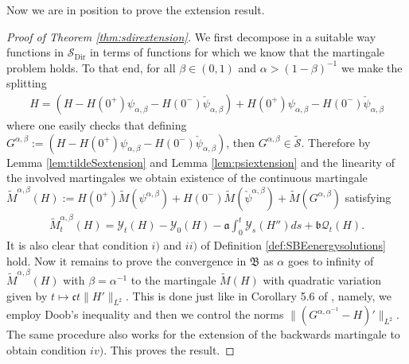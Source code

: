 \documentclass[a4paper, reqno, 12pt]{amsart}
\theoremstyle{plain}
\theoremstyle{definition}
\begin{document}
Now we are in position to prove the extension result.

\begin{proof}[Proof of Theorem \ref{thm:sdirextension}]
  We first decompose in a suitable way functions in $\mathcal S_{\textrm{Dir}}$ in terms of functions for which we know that the martingale problem holds. To that end, for all $\beta\in(0,1)$ and $\alpha>(1-\beta)^{-1}$ we make the splitting
    \begin{align*}
        H = (H - H(0^+)\psi_{\alpha,\beta} -H(0^-)\check\psi_{\alpha,\beta}) + H(0^+)\psi_{\alpha,\beta} -H(0^-)\check\psi_{\alpha,\beta}
    \end{align*}
    where one easily checks that defining $G^{\alpha,\beta}:=(H - H(0^+)\psi_{\alpha,\beta} -H(0^-)\check\psi_{\alpha,\beta})$, then  $G^{\alpha,\beta}\in \tilde{\mathcal S}$. Therefore by Lemma \ref{lem:tildeSextension} and Lemma \ref{lem:psiextension} and the linearity of the involved martingales we obtain existence of the continuous martingale $\tilde M^{\alpha,\beta}(H) := H(0^+)\tilde M(\psi^{\alpha,\beta}) + H(0^-)\tilde M(\check \psi^{\alpha,\beta}) + \tilde M(G^{\alpha,\beta})$ satisfying
    \begin{align}\label{eq:alphabetamartingale}
        \tilde M^{\alpha,\beta}_t(H) = \mathcal Y_t(H) -\mathcal Y_0(H) - \mathfrak a\int_0^t\mathcal Y_s(H'') ds + \mathfrak b\mathcal  Q_t(H).
    \end{align} 
    It is also clear that condition  $i)$ and $ii)$ of Definition \ref{def:SBEenergysolutions} hold.
    Now it remains to prove the convergence in $\mathfrak B$ as $\alpha$ goes to infinity of $\tilde M^{\alpha,\beta}(H)$ with $\beta=\alpha^{-1}$ to the martingale $\tilde M(H)$ with quadratic variation given by $t\mapsto \mathfrak ct\|H'\|_{L^2}$. This is done just like in Corollary 5.6 of \cite{BGJS22}, namely, we employ  Doob's inequality and then we control the norms $\|(G^{\alpha,\alpha^{-1}}-H)'\|_{L^2}$. The same procedure also works for the extension of the backwards martingale to obtain condition $iv)$. This proves the result.
\end{proof}


\appendix
\end{document}
